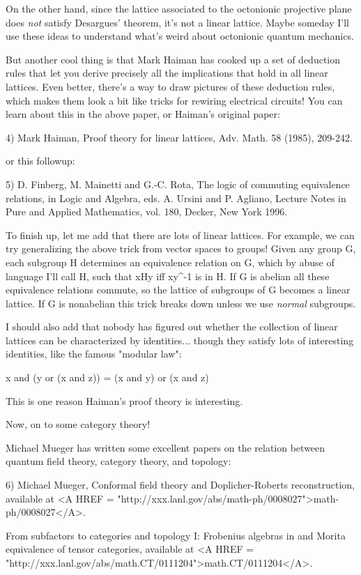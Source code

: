 On the other hand, since the lattice associated to the octonionic
projective plane does \emph{not} satisfy  Desargues' theorem, it's not a
linear lattice.   Maybe someday I'll use these ideas to understand
what's weird about octonionic quantum mechanics.  

But another cool thing is that Mark Haiman has cooked up a set of
deduction rules that let you derive precisely all the implications that
hold in all linear lattices.  Even better, there's a way to draw
pictures of these deduction rules, which makes them look a bit like
tricks for rewiring electrical circuits!  You can learn about this in
the above paper, or Haiman's original paper:

4) Mark Haiman, Proof theory for linear lattices, Adv. Math. 58 (1985),
209-242.

or this followup:

5) D. Finberg, M. Mainetti and G.-C. Rota, The logic of commuting
equivalence relations, in Logic and Algebra, eds. A. Ursini and P. 
Agliano, Lecture Notes in Pure and Applied Mathematics, vol. 180,
Decker, New York 1996.

To finish up, let me add that there are lots of linear lattices.  For
example, we can try generalizing the above trick from vector spaces to
groups!  Given any group G, each subgroup H determines an equivalence 
relation on G, which by abuse of language I'll call H, such that xHy iff
xy^{-1} is in H.  If G is abelian all these equivalence relations
commute, so the lattice of subgroups of G becomes a linear lattice.  If
G is nonabelian this trick breaks down unless we use \emph{normal} 
subgroups.

I should also add that nobody has figured out whether the collection
of linear lattices can be characterized by identities... though they
satisfy lots of interesting identities, like the famous "modular law":

x and (y or (x and z)) = (x and y) or (x and z)

This is one reason Haiman's proof theory is interesting.

Now, on to some category theory!

Michael Mueger has written some excellent papers on the relation
between quantum field theory, category theory, and topology:

6) Michael Mueger, Conformal field theory and Doplicher-Roberts
reconstruction, available at <A HREF = "http://xxx.lanl.gov/abs/math-ph/0008027">math-ph/0008027</A>.

From subfactors to categories and topology I:
Frobenius algebras in and Morita equivalence of tensor categories,
available at <A HREF = "http://xxx.lanl.gov/abs/math.CT/0111204">math.CT/0111204</A>.

